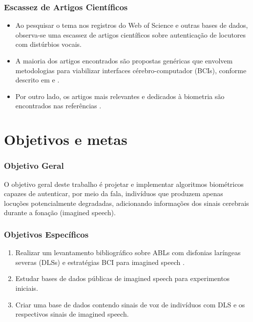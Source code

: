 \documentclass{beamer}
\begin{document}
	\begin{frame}
		\frametitle{Escassez de Artigos Científicos}
		\begin{itemize}
			\item Ao pesquisar o tema nos registros do Web of Science e outras bases de dados, observa-se uma escassez de artigos científicos sobre autenticação de locutores com distúrbios vocais.
			\item A maioria dos artigos encontrados são propostas genéricas que envolvem metodologias para viabilizar interfaces cérebro-computador (BCIs), conforme descrito em \cite{rusnac2021eeg} e \cite{brigham2010imagined}.
			\item Por outro lado, os artigos mais relevantes e dedicados à biometria são encontrados nas referências \cite{moctezuma2019subjects, moctezuma2018eeg, jayarathne2016brainid, jayarathne2017survey, del2014electroencephalogram, ruiz2016cerebre}.
		\end{itemize}
	\end{frame}
	
	\section{Objetivos e metas}
	\begin{frame}
		\frametitle{Objetivo Geral}
		O objetivo geral deste trabalho é projetar e implementar algoritmos biométricos capazes de autenticar, por meio da fala, indivíduos que produzem apenas locuções potencialmente degradadas, adicionando informações dos sinais cerebrais durante a fonação (imagined speech).
	\end{frame}
	
	\begin{frame}
		\frametitle{Objetivos Específicos}
		\begin{enumerate}
			\item Realizar um levantamento bibliográfico sobre ABLs com disfonias laríngeas severas (DLSs) e estratégias BCI para imagined speech \cite{10.1117/12.2255697}.
			\item Estudar bases de dados públicas de imagined speech para experimentos iniciais.
			\item Criar uma base de dados contendo sinais de voz de indivíduos com DLS e os respectivos sinais de imagined speech.
		\end{enumerate}
	\end{frame}
	
\end{document}
